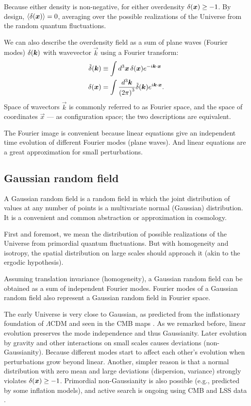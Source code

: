 Because either density is non-negative, for either overdensity $\delta \qty(\bm x) \ge -1$.
By design, $\ev{\delta \qty(\vec x)} = 0$, averaging over the possible realizations of the Universe from the random quantum fluctuations.

We can also describe the overdensity field as a sum of plane waves (Fourier modes) $\delta \qty(\bm k)$ with wavevector $\vec k$ using a Fourier transform:
\begin{align}
    \tilde \delta \qty(\bm k) &\equiv \int d^3 \bm x\, \delta \qty(\bm x) e^{-i \bm k \cdot \bm x} \label{eq:overdensity-fourier} \\
    \delta \qty(\bm x) &= \int \frac{d^3 \bm k}{\qty(2\pi)^3} \tilde \delta \qty(\bm k) e^{i \bm k \cdot \bm x}.
\end{align}
Space of wavectors $\vec k$ is commonly referred to as Fourier space, and the space of coordinates $\vec x$ --- as configuration space; the two descriptions are equivalent.

The Fourier image is convenient because linear equations give an independent time evolution of different Fourier modes (plane waves).
And linear equations are a great approximation for small perturbations.

\subsection{Gaussian random field}

A Gaussian random field is a random field in which the joint distribution of values at any number of points is a multivariate normal (Gaussian) distribution.
It is a convenient and common abstraction or approximation in cosmology.

First and foremost, we mean the distribution of possible realizations of the Universe from primordial quantum fluctuations.
But with homogeneity and isotropy, the spatial distribution on large scales should approach it (akin to the ergodic hypothesis).

Assuming translation invariance (homogeneity), a Gaussian random field can be obtained as a sum of independent Fourier modes.
Fourier modes of a Gaussian random field also represent a Gaussian random field in Fourier space.

The early Universe is very close to Gaussian, as predicted from the inflationary foundation of $\Lambda$CDM and seen in the CMB maps \citep[e.g.,][]{planck_overview}.
As we remarked before, linear evolution preserves the mode independence and thus Gaussianity.
Later evolution by gravity and other interactions on small scales causes deviations (non-Gaussianity).
Because different modes start to affect each other's evolution when perturbations grow beyond linear.
Another, simpler reason is that a normal distribution with zero mean and large deviations (dispersion, variance) strongly violates $\delta \qty(\bm x) \ge -1$.
Primordial non-Gaussianity is also possible (e.g., predicted by some inflation models), and active search is ongoing using CMB \citep[e.g.,][]{Planck18-PNG} and LSS data \citep[e.g.,][]{local-PNG-DESI-LRG-photometric,ChaussidonY1fnl}.

